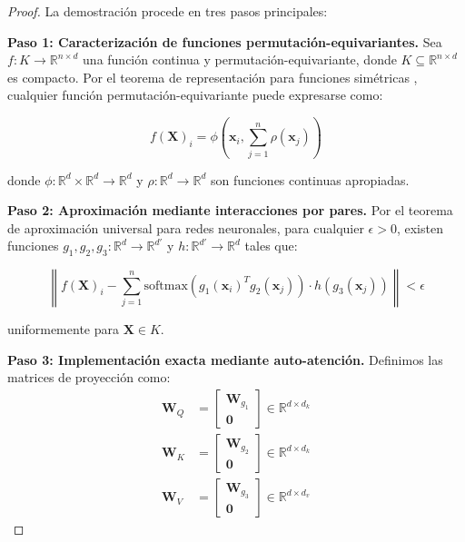 \begin{proof}
    La demostración procede en tres pasos principales:
    
    \textbf{Paso 1: Caracterización de funciones permutación-equivariantes.}
    Sea $f: K \to \mathbb{R}^{n \times d}$ una función continua y permutación-equivariante, donde $K \subseteq \mathbb{R}^{n \times d}$ es compacto. Por el teorema de representación para funciones simétricas \citep{zaheer2017deepsets}, cualquier función permutación-equivariante puede expresarse como:
    
    \begin{equation}
        f(\mathbf{X})_i = \phi\left(\mathbf{x}_i, \sum_{j=1}^n \rho(\mathbf{x}_j)\right)
        \label{eq:symmetric_representation}
    \end{equation}
    
    donde $\phi: \mathbb{R}^d \times \mathbb{R}^d \to \mathbb{R}^d$ y $\rho: \mathbb{R}^d \to \mathbb{R}^d$ son funciones continuas apropiadas.
    
    \textbf{Paso 2: Aproximación mediante interacciones por pares.}
    Por el teorema de aproximación universal para redes neuronales, para cualquier $\epsilon > 0$, existen funciones $g_1, g_2, g_3: \mathbb{R}^d \to \mathbb{R}^{d'}$ y $h: \mathbb{R}^{d'} \to \mathbb{R}^d$ tales que:
    
    \begin{equation}
        \left\|f(\mathbf{X})_i - \sum_{j=1}^n \text{softmax}(g_1(\mathbf{x}_i)^T g_2(\mathbf{x}_j)) \cdot h(g_3(\mathbf{x}_j))\right\| < \epsilon
        \label{eq:pairwise_approximation}
    \end{equation}
    
    uniformemente para $\mathbf{X} \in K$.
    
    \textbf{Paso 3: Implementación exacta mediante auto-atención.}
    Definimos las matrices de proyección como:
    \begin{align}
        \mathbf{W}_Q &= \begin{bmatrix} \mathbf{W}_{g_1} \\ \mathbf{0} \end{bmatrix} \in \mathbb{R}^{d \times d_k} \\
        \mathbf{W}_K &= \begin{bmatrix} \mathbf{W}_{g_2} \\ \mathbf{0} \end{bmatrix} \in \mathbb{R}^{d \times d_k} \\
        \mathbf{W}_V &= \begin{bmatrix} \mathbf{W}_{g_3} \\ \mathbf{0} \end{bmatrix} \in \mathbb{R}^{d \times d_v}
    \end{align}
    

\end{proof}
